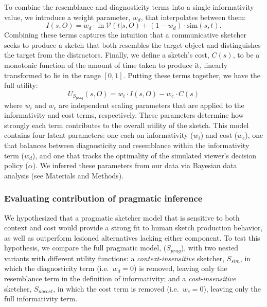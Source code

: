 \documentclass[9pt,twocolumn,twoside]{pnas-new}
\begin{document}
To combine the resemblance and diagnosticity terms into a single informativity value, we introduce a weight parameter, $w_{d}$, that interpolates between them:
\begin{equation} \label{prag_interpolation}
I(s,O) = w_{d} \cdot \ln \mathcal{V}(t|s,O) + (1-w_{d}) \cdot \textrm{sim}(s,t). 
\end{equation} 
Combining these terms captures the intuition that a communicative sketcher seeks to produce a sketch that both resembles the target object and distinguishes the target from the distractors.
Finally, we define a sketch's cost, $C(s)$, to be a monotonic function of the amount of time taken to produce it, linearly transformed to lie in the range $[0,1]$. 
Putting these terms together, we have the full utility:
\begin{equation} \label{sketcher_utility}
U_{S_{prag}}(s,O) = w_i \cdot I(s,O) - w_c \cdot  C(s)
\end{equation}
where $w_i$ and $w_c$ are independent scaling parameters that are applied to the informativity and cost terms, respectively.
These parameters determine how strongly each term contributes to the overall utility of the sketch. 
This model contains four latent parameters: one each on informativity ($w_{i}$) and cost ($w_{c}$), one that balances between diagnosticity and resemblance within the informativity term ($w_{d}$), and one that tracks the optimality of the simulated viewer's decision policy ($\alpha$). 
We inferred these parameters from our data via Bayesian data analysis (see Materials and Methods).


\subsubsection*{Evaluating contribution of pragmatic inference}

We hypothesized that a pragmatic sketcher model that is sensitive to both context and cost would provide a strong fit to human sketch production behavior, as well as outperform lesioned alternatives lacking either component.
To test this hypothesis, we compare the full pragmatic model, ($S_{prag}$), with two nested variants with different utility functions:
a \textit{context-insensitive} sketcher, $S_{sim}$, in which the diagnosticity term (i.e.~$w_{d}{=}0$) is removed, leaving only the resemblance term in the definition of informativity; and  
a \textit{cost-insensitive} sketcher, $S_{nocost}$, in which the cost term is removed (i.e.~$w_c=0$), leaving only the full informativity term. 
\end{document}
